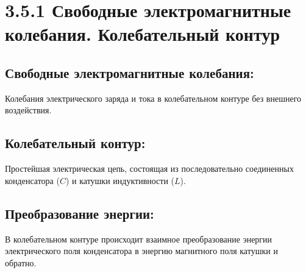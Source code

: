 \documentclass[a4paper,12pt]{article}
\begin{document}
\begin{center}
\end{center}

\vspace{-2.5em}








\section*{3.5.1 Свободные электромагнитные колебания. Колебательный контур}
\vspace{-9pt}
\subsection*{Свободные электромагнитные колебания:}
\vspace{-3pt}
Колебания электрического заряда и тока в колебательном контуре без внешнего воздействия.

\vspace{-9pt}
\subsection*{Колебательный контур:}
\vspace{-3pt}
Простейшая электрическая цепь, состоящая из последовательно соединенных конденсатора ($C$) и катушки индуктивности ($L$).

\vspace{-9pt}
\subsection*{Преобразование энергии:}
\vspace{-3pt}
В колебательном контуре происходит взаимное преобразование энергии электрического поля конденсатора в энергию магнитного поля катушки и обратно.
\end{document}
